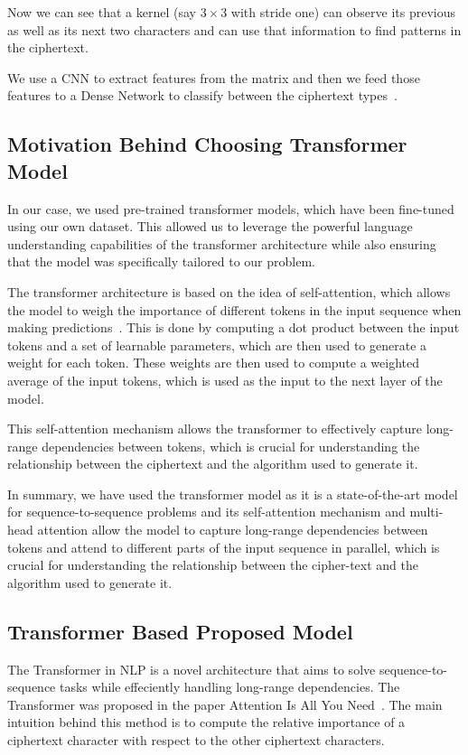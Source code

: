 \documentclass[runningheads]{llncs}
\begin{document}
Now we can see that a kernel (say $3 \times 3$ with stride one) 
can observe its previous as well as its next two characters and can 
use that information to find patterns in the ciphertext.

We use a CNN to extract features from the matrix and then we 
feed those features to a Dense Network to classify between the 
ciphertext types~\cite{DBLP:journals/corr/OSheaN15}.

\subsection{Motivation Behind Choosing Transformer Model}  

In our case, we used pre-trained transformer models, which have been fine-tuned using our own dataset. This allowed us to leverage the powerful language understanding capabilities of the transformer architecture while also ensuring that the model was specifically tailored to our problem.

The transformer architecture is based on the idea of self-attention, which allows the model to weigh the importance of different tokens in the input sequence when making predictions~\cite{vaswani2017attention}. This is done by computing a dot product between the input tokens and a set of learnable parameters, which are then used to generate a weight for each token. These weights are then used to compute a weighted average of the input tokens, which is used as the input to the next layer of the model.

This self-attention mechanism allows the transformer to effectively capture long-range dependencies between tokens, which is crucial for understanding the relationship between the ciphertext and the algorithm used to generate it. 

In summary, we have used the transformer model as it is a state-of-the-art model for sequence-to-sequence problems and its self-attention mechanism and multi-head attention allow the model to capture long-range dependencies between tokens and attend to different parts of the input sequence in parallel, which is crucial for understanding the relationship between the cipher-text and the algorithm used to generate it. 

\subsection{Transformer Based Proposed Model}  

The Transformer in NLP is a novel architecture that aims to 
solve sequence-to-sequence tasks while effeciently handling long-range dependencies. The Transformer was proposed in the paper Attention 
Is All You Need~\cite{vaswani2017attention}. The main intuition behind this method is to compute the relative 
importance of a ciphertext character with respect to the other 
ciphertext characters. 
\end{document}
